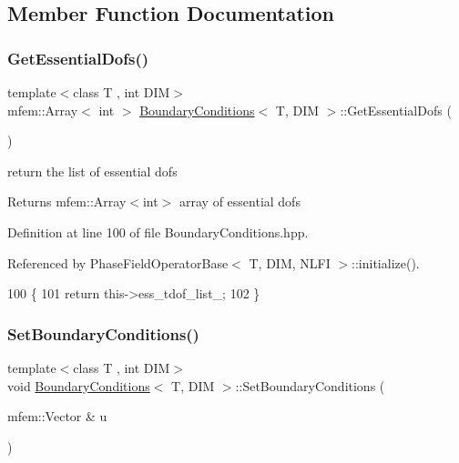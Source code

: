 \subsection{Member Function Documentation}
\mbox{\label{classBoundaryConditions_a3dcecb34a6ac7a00e6f110677145f7c8}} 
\subsubsection{\texorpdfstring{Get\+Essential\+Dofs()}{GetEssentialDofs()}}
{\footnotesize\ttfamily template$<$class T , int D\+IM$>$ \\
mfem\+::\+Array$<$ int $>$ \hyperlink{classBoundaryConditions}{Boundary\+Conditions}$<$ T, D\+IM $>$\+::Get\+Essential\+Dofs (\begin{DoxyParamCaption}{ }\end{DoxyParamCaption})}



return the list of essential dofs 

\begin{DoxyReturn}{Returns}
mfem\+::\+Array$<$int$>$ array of essential dofs 
\end{DoxyReturn}


Definition at line 100 of file Boundary\+Conditions.\+hpp.



Referenced by Phase\+Field\+Operator\+Base$<$ T, D\+I\+M, N\+L\+F\+I $>$\+::initialize().


\begin{DoxyCode}
100                                                             \{
101   \textcolor{keywordflow}{return} this->ess\_tdof\_list\_;
102 \}
\end{DoxyCode}
\mbox{\label{classBoundaryConditions_a23f5cf33a22290a61bb2dcba457f086d}} 
\subsubsection{\texorpdfstring{Set\+Boundary\+Conditions()}{SetBoundaryConditions()}}
{\footnotesize\ttfamily template$<$class T , int D\+IM$>$ \\
void \hyperlink{classBoundaryConditions}{Boundary\+Conditions}$<$ T, D\+IM $>$\+::Set\+Boundary\+Conditions (\begin{DoxyParamCaption}\item[{mfem\+::\+Vector \&}]{u }\end{DoxyParamCaption})}



